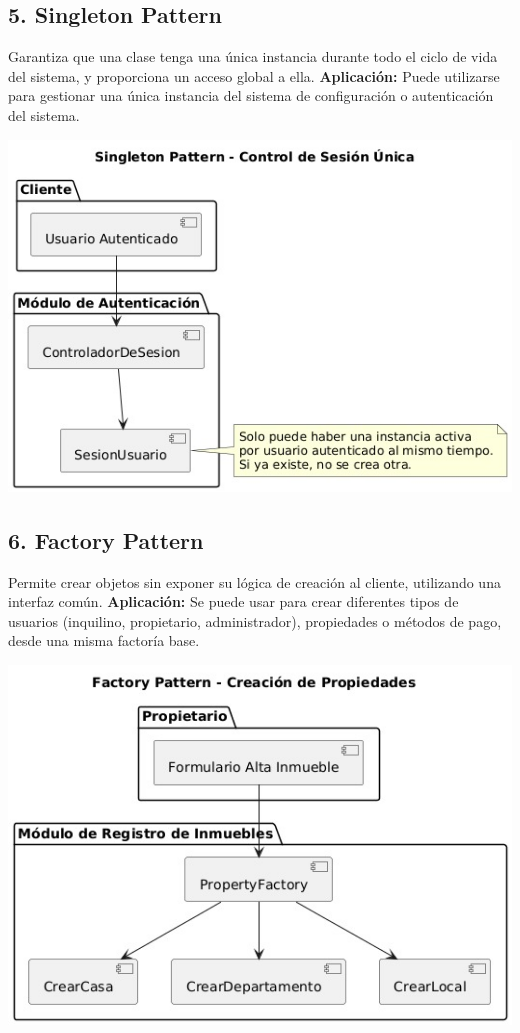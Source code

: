 	\subsection*{5. Singleton Pattern}
		\noindent Garantiza que una clase tenga una única instancia durante todo el ciclo de vida del sistema, y proporciona un acceso global a ella.  
		\textbf{Aplicación:} Puede utilizarse para gestionar una única instancia del sistema de configuración o autenticación del sistema.
		\begin{center}
			\includegraphics[width=\linewidth]{figures/patterns/singleton.jpg}
			\label{fig:img13}
		\end{center}
	
	\subsection*{6. Factory Pattern}
		\noindent Permite crear objetos sin exponer su lógica de creación al cliente, utilizando una interfaz común.  
		\textbf{Aplicación:} Se puede usar para crear diferentes tipos de usuarios (inquilino, propietario, administrador), propiedades o métodos de pago, desde una misma factoría base.
		\begin{center}
			\includegraphics[width=\linewidth]{figures/patterns/factory.jpg}
			\label{fig:img14}
		\end{center}
	
